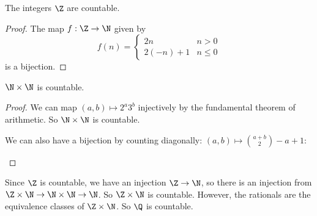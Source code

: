 \documentclass[a4paper]{article}
\begin{document}
  \begin{prop}
    The integers $\Z$ are countable.
  \end{prop}
  \begin{proof}
    The map $f: \Z\to \N$ given by
    \[
      f(n) = 
      \begin{cases}
        2n & n > 0\\
        2(-n) + 1 & n \leq 0
      \end{cases}
    \]
    is a bijection.
  \end{proof}

  \begin{prop}
    $\N \times \N$ is countable.
  \end{prop}
  \begin{proof}
    We can map $(a, b)\mapsto 2^a3^b$ injectively by the fundamental theorem of arithmetic. So $\N\times \N$ is countable.

    We can also have a bijection by counting diagonally: $(a, b) \mapsto {a + b\choose 2} - a + 1$: 

    \begin{center}

      \usetikzlibrary{decorations.markings}

    \end{center}
  \end{proof}

  Since $\Z$ is countable, we have an injection $\Z\to \N$, so there is an injection from $\Z\times \N\to \N\times \N \to \N$. So $\Z \times \N$ is countable. However, the rationals are the equivalence classes of $\Z\times\N$. So $\Q$ is countable.
\end{document}
